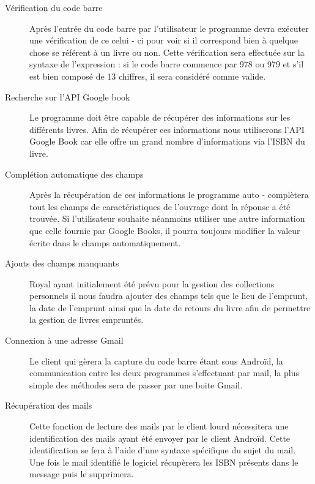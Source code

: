 \begin{description}
\item[Vérification du code barre]
	Après l'entrée du code barre par l'utilisateur le programme devra exécuter une vérification de ce celui - ci pour voir si il correspond bien à quelque chose se référent à un livre ou non. 
	Cette vérification sera effectuée sur la syntaxe de l'expression : si le code barre commence par 978 ou 979 et s'il est bien composé de 13 chiffres, il sera considéré comme valide. 

\item[Recherche sur l'API Google book]
	Le programme doit être capable de récupérer des informations sur les différents livres.
	Afin de récupérer ces informations nous utiliserons l'API Google Book car elle offre un grand nombre d'informations via l'ISBN du livre.

\item[Complétion automatique des champs]
	Après la récupération de ces informations le programme auto - complètera tout les champs de caractéristiques de l'ouvrage dont la réponse a été trouvée.
	Si l'utilisateur souhaite néanmoins utiliser une autre information que celle fournie par Google Books, il pourra toujours modifier la valeur écrite dans le champs automatiquement.

\item[Ajouts des champs manquants]
	Royal ayant initialement été prévu pour la gestion des collections personnels il nous faudra ajouter des champs tels que le lieu de l'emprunt, la date de l'emprunt ainsi que la date de retours du livre afin de permettre la gestion de livres empruntés. 

\item[Connexion à une adresse Gmail]
	Le client qui gèrera la capture du code barre étant sous Androïd, la communication entre les deux programmes s'effectuant par mail, la plus simple des méthodes sera de passer par une boite Gmail.

\item[Récupération des mails]
	Cette fonction de lecture des mails par le client lourd nécessitera une identification des mails ayant été envoyer par le client Androïd. 
	Cette identification se fera à l'aide d'une syntaxe spécifique du sujet du mail. Une fois le mail identifié le logiciel récupèrera les ISBN présents dans le message puis le supprimera.  

\end{description}
